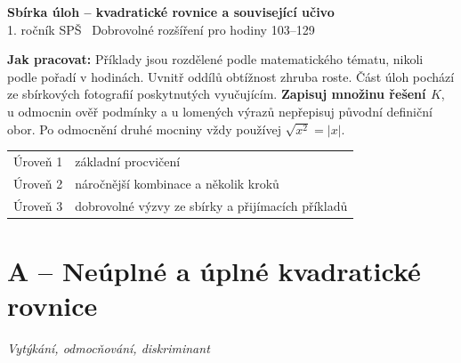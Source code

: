 \documentclass[11pt,a4paper]{article}
\begin{document}
\begin{center}
{\LARGE\bfseries Sbírka úloh -- kvadratické rovnice a související učivo}\\[2mm]
{\normalsize 1. ročník SPŠ \textbar\ Dobrovolné rozšíření pro hodiny 103--129}\\[3mm]
\end{center}
\textbf{Jak pracovat:} Příklady jsou rozdělené podle matematického tématu, nikoli podle pořadí v hodinách.
Uvnitř oddílů obtížnost zhruba roste. Část úloh pochází ze sbírkových fotografií poskytnutých vyučujícím.
\textbf{Zapisuj množinu řešení $K$}, u odmocnin ověř podmínky a u lomených výrazů nepřepisuj původní definiční obor.
Po odmocnění druhé mocniny vždy používej $\sqrt{x^2}=|x|$.
\begin{center}\small
\begin{tabular}{@{}ll@{}}\toprule
Úroveň 1 & základní procvičení\\
Úroveň 2 & náročnější kombinace a několik kroků\\
Úroveň 3 & dobrovolné výzvy ze sbírky a přijímacích příkladů\\
\bottomrule\end{tabular}
\end{center}
\section*{A -- Neúplné a úplné kvadratické rovnice}
\textit{Vytýkání, odmocňování, diskriminant}
\end{document}
